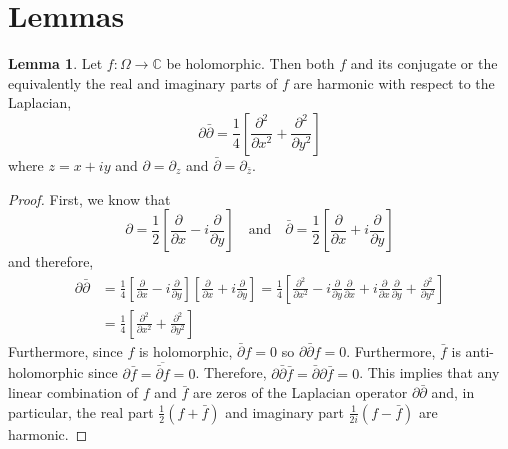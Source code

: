 \documentclass[12pt]{extarticle}
\newcommand{\C}{\mathbb{C}}
\newcommand{\pderiv}[2]{\frac{\partial{#1}}{\partial{#2}}}
\newcommand{\parsq}[2]{\frac{\partial^2{#1}}{\partial{#2}^2}}
\theoremstyle{definition}
\newtheorem{lemma}[theorem]{Lemma}
\begin{document}
\section{Lemmas}

\begin{lemma} \label{harmonic}
Let $f : \Omega \to \C$ be holomorphic. Then both $f$ and its conjugate or the equivalently the real and imaginary parts of $f$ are harmonic with respect to the Laplacian,
\[ \partial \bar{\partial} = \frac{1}{4} \left[ \parsq{}{x} + \parsq{}{y} \right] \]
where $z = x + i y$ and $\partial = \partial_z$ and $\bar{\partial} = \partial_{\bar{z}}$.  
\end{lemma}

\begin{proof}
First, we know that 
\[\partial = \frac{1}{2} \left[ \pderiv{}{x} - i \pderiv{}{y} \right] \quad \text{and} \quad \bar{\partial} = \frac{1}{2} \left[ \pderiv{}{x} + i \pderiv{}{y} \right] \]
and therefore,
\begin{align*}
\partial \bar{\partial} & = \frac{1}{4} \left[ \pderiv{}{x} - i \pderiv{}{y} \right] \left[ \pderiv{}{x} + i \pderiv{}{y} \right] = \frac{1}{4} \left[ \parsq{}{x} - i \pderiv{}{y} \pderiv{}{x} + i \pderiv{}{x} \pderiv{}{y} + \parsq{}{y} \right] 
\\
& = \frac{1}{4} \left[ \parsq{}{x} + \parsq{}{y} \right]
\end{align*}
Furthermore, since $f$ is holomorphic, $\bar{\partial} f = 0$ so $\partial \bar{\partial} f = 0$. Furthermore, $\bar{f}$ is anti-holomorphic since $\partial \bar{f} = \overline{\bar{\partial} f} = 0$. Therefore, $\partial \bar{\partial} \bar{f} = \bar{\partial} \partial \bar{f} = 0$. This implies that any linear combination of $f$ and $\bar{f}$ are zeros of the Laplacian operator $\partial \bar{\partial}$ and, in particular, the real part $\tfrac{1}{2} (f + \bar{f})$ and imaginary part $\tfrac{1}{2i} (f - \bar{f})$ are harmonic. 
\end{proof}
\end{document}
